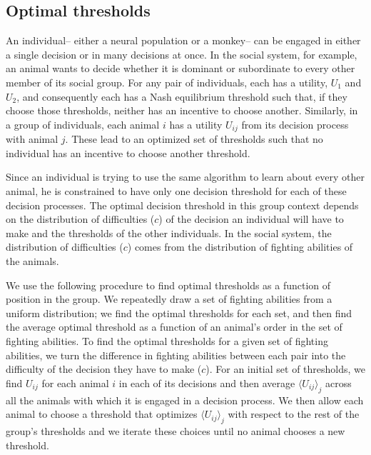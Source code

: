 \documentclass{article}
\begin{document}
\subsection{Optimal thresholds }
An individual-- either a neural population or a monkey-- can be engaged in either a single decision or in many decisions at once.  In the social system, for example, an animal wants to decide whether it is dominant or subordinate to every other member of its social group.  For any pair of individuals, each has a utility, $U_1$ and $U_2$, and consequently each has a Nash equilibrium threshold such that, if they choose those thresholds, neither has an incentive to choose another.  Similarly, in a group of individuals, each animal $i$ has a utility $U_{ij}$ from its decision process with animal $j$.  These lead to an optimized set of thresholds such that no individual has an incentive to choose another threshold.

Since an individual is trying to use the same algorithm to learn about every other animal, he is constrained to have only one decision threshold for each of these decision processes.  The optimal decision threshold in this group context depends on the distribution of difficulties ($c$) of the decision an individual will have to make and the thresholds of the other individuals.  In the social system, the distribution of difficulties ($c$) comes from the distribution of fighting abilities of the animals.  

 We use the following procedure to find optimal thresholds as a function of position in the group.  We repeatedly draw a set of fighting abilities from a uniform distribution; we find the optimal thresholds for each set, and then find the average optimal threshold as a function of an animal's order in the set of fighting abilities. To find the optimal thresholds for a given set of fighting abilities, we turn the difference in fighting abilities between each pair into the difficulty of the decision they have to make ($c$).  For an initial set of thresholds, we find $U_{ij}$ for each animal $i$ in each of its decisions and then average $\langle U_{ij}\rangle_j$ across all the animals with which it is engaged in a decision process.  We then allow each animal to choose a threshold that optimizes $\langle U_{ij}\rangle_j$ with respect to the rest of the group's thresholds and we iterate these choices until no animal chooses a new threshold.  
\end{document}
